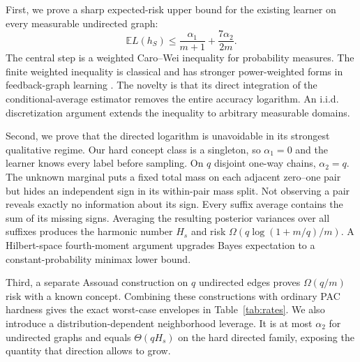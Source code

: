 \documentclass{article}
\newcommand{\E}{\mathbb E}
\newcommand{\1}{\mathbf 1}
\begin{document}
First, we prove a sharp expected-risk upper bound for the existing learner on every measurable undirected graph: \[ \E L(h_S)\le \frac{\alpha_1}{m+1}+\frac{7\alpha_2}{2m}. \] The central step is a weighted Caro--Wei inequality for probability measures. The finite weighted inequality is classical and has stronger power-weighted forms in feedback-graph learning \citep{caro1979,wei1981,eldowa2023}. The novelty is that its direct integration of the conditional-average estimator removes the entire accuracy logarithm. An i.i.d. discretization argument extends the inequality to arbitrary measurable domains.

Second, we prove that the directed logarithm is unavoidable in its strongest qualitative regime. Our hard concept class is a singleton, so $\alpha_1=0$ and the learner knows every label before sampling. On $q$ disjoint one-way chains, $\alpha_2=q$. The unknown marginal puts a fixed total mass on each adjacent zero--one pair but hides an independent sign in its within-pair mass split. Not observing a pair reveals exactly no information about its sign. Every suffix average contains the sum of its missing signs. Averaging the resulting posterior variances over all suffixes produces the harmonic number $H_s$ and risk $\Omega(q\log(1+m/q)/m)$. A Hilbert-space fourth-moment argument upgrades Bayes expectation to a constant-probability minimax lower bound.

Third, a separate Assouad construction on $q$ undirected edges proves $\Omega(q/m)$ risk with a known concept. Combining these constructions with ordinary PAC hardness gives the exact worst-case envelopes in Table~\ref{tab:rates}. We also introduce a distribution-dependent neighborhood leverage. It is at most $\alpha_2$ for undirected graphs and equals $\Theta(qH_s)$ on the hard directed family, exposing the quantity that direction allows to grow.
\end{document}
